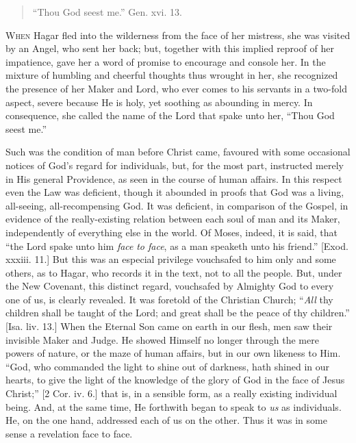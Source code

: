 
\begin{quote}

``Thou God seest me.'' Gen. xvi. 13.

\end{quote}

W\textsc{hen} Hagar fled into the wilderness from the face of her mistress,
she was visited by an Angel, who sent her back; but, together with
this implied reproof of her impatience, gave her a word of promise to
encourage and console her. In the mixture of humbling and cheerful
thoughts thus wrought in her, she recognized the presence of her Maker
and Lord, who ever comes to his servants in a two-fold aspect, severe
because He is holy, yet soothing as abounding in mercy. In
consequence, she called the name of the Lord that spake unto her,
``Thou God seest me.''

Such was the condition of man before Christ came, favoured with
some occasional notices of God's regard for individuals, but, for the
most part, instructed merely in His general Providence, as seen in the
course of human affairs. In this respect even the Law was deficient,
though it abounded in proofs that God was a living, all-seeing,
all-recompensing God. It was deficient, in comparison of the Gospel,
in evidence of the really-existing relation between each soul of man
and its Maker, independently of everything else in the world. Of
Moses, indeed, it is said, that ``the Lord spake unto him \emph{face}
\emph{to face}, as a man speaketh unto his friend.'' [Exod. xxxiii.
11.] But this was an especial privilege vouchsafed to him only and
some others, as to Hagar, who records it in the text, not to all the
people. But, under the New Covenant, this distinct regard, vouchsafed
by Almighty God to every one of us, is clearly revealed. It was
foretold of the Christian Church; ``\emph{All} thy children shall
be taught of the Lord; and great shall be the peace of thy
children.'' [Isa. liv. 13.] When the Eternal Son came on earth in
our flesh, men saw their invisible Maker and Judge. He showed Himself
no longer through the mere powers of nature, or the maze of human
affairs, but in our own likeness to Him. ``God, who commanded the
light to shine out of darkness, hath shined in our hearts, to give the
light of the knowledge of the glory of God in the face of Jesus
Christ;'' [2 Cor. iv. 6.] that is, in a sensible form, as a really
existing individual being. And, at the same time, He forthwith began
to speak to \emph{us} as individuals. He, on the one hand, addressed
each of us on the other. Thus it was in some sense a revelation face
to face.

